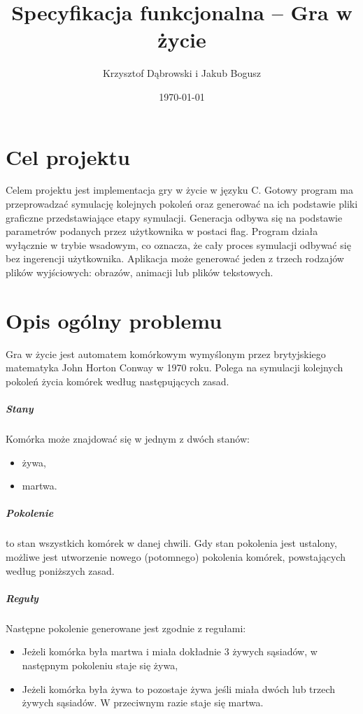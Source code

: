 \documentclass{report}
\title{Specyfikacja funkcjonalna -- Gra w życie}
\author{Krzysztof Dąbrowski i Jakub Bogusz}
\date{\today}
\begin{document}
\maketitle{}

\tableofcontents{}

\chapter{Cel projektu}
Celem projektu jest implementacja gry w życie w języku C. Gotowy program ma przeprowadzać symulację kolejnych pokoleń oraz generować na ich podstawie pliki graficzne przedstawiające etapy symulacji. Generacja odbywa się na podstawie parametrów podanych przez użytkownika w postaci flag. Program działa wyłącznie w trybie wsadowym, co oznacza, że cały proces symulacji odbywać się bez ingerencji użytkownika. Aplikacja może generować jeden z trzech rodzajów plików wyjściowych: obrazów, animacji lub plików tekstowych.

\chapter{Opis ogólny problemu}
Gra w życie jest automatem komórkowym wymyślonym przez brytyjskiego matematyka John Horton Conway
w 1970 roku. Polega na symulacji kolejnych pokoleń życia komórek według następujących zasad.

\paragraph{Stany}  Komórka może znajdować się w jednym z dwóch stanów:
\begin{itemize}
\item żywa,
\item martwa.
\end{itemize}

\paragraph{Pokolenie} to stan wszystkich komórek w danej chwili. Gdy stan pokolenia jest ustalony, możliwe jest utworzenie nowego (potomnego) pokolenia komórek, powstających według poniższych zasad.

\paragraph{Reguły} Następne pokolenie generowane jest zgodnie z regułami:
\begin{itemize}
\item Jeżeli komórka była martwa i miała dokładnie 3 żywych sąsiadów, w następnym pokoleniu staje się żywa,
\item Jeżeli komórka była żywa to pozostaje żywa jeśli miała dwóch lub trzech żywych sąsiadów. W przeciwnym razie staje się martwa.
\end{itemize}
\end{document}
